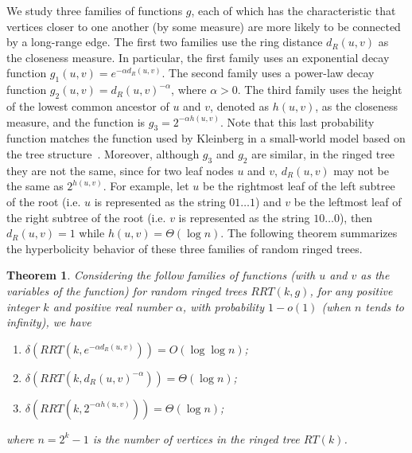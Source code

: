 \documentclass[11pt]{article}
\newtheorem{thm}{Theorem}
\begin{document}
We study three families of functions $g$, each of which has the characteristic
	that vertices closer to one another (by some measure) are more likely
	to be connected by a long-range edge.
The first two families use the ring distance $d_R(u,v)$ as the closeness
	measure.
In particular, the first family uses an exponential decay function
	$g_1(u,v) = e^{-\alpha d_R(u,v)}$.
The second family uses a power-law decay function
	$g_2(u,v) = d_R(u,v)^{-\alpha}$, where $\alpha > 0$.
The third family uses the height of the lowest common ancestor
	of $u$ and $v$, denoted as $h(u,v)$, as the closeness measure,
	and the function is $g_3=2^{-\alpha h(u,v)}$.
Note that this last probability function matches the function used by 
Kleinberg in a small-world model based on the tree structure~\cite{Kle01}.
Moreover, although $g_3$ and $g_2$ are similar, 
	in the ringed tree they are not the same, 
	since for two leaf nodes $u$ and $v$, $d_R(u,v)$ may not be the same as $2^{h(u,v)}$.
For example, let $u$ be the rightmost leaf of the left subtree of the root 
	(i.e. $u$ is represented as the string $01\ldots 1$) and $v$ be the leftmost leaf
	of the right subtree of the root (i.e. $v$ is represented as the string $10\ldots 0$),
	then $d_R(u,v)=1$ while $h(u,v)= \Theta(\log n)$.
The following theorem summarizes the hyperbolicity behavior of these three 
families of random ringed trees.

\begin{thm} \label{thm:randomRT}
Considering the follow families of functions (with $u$ and $v$
	as the variables of the function) for random ringed trees
	$RRT(k,g)$, for any positive integer $k$ and
	positive real number $\alpha$, 
	with probability $1-o(1)$ (when $n$ tends to infinity), 
	we have
\begin{enumerate}
\item
$\delta(RRT(k,e^{-\alpha d_R(u,v)}))=O(\log \log n)$;
\item
$\delta(RRT(k,d_R(u,v)^{-\alpha}))=\Theta(\log n)$;
\item
$\delta(RRT(k,2^{-\alpha h(u,v)}))=\Theta(\log n)$;
\end{enumerate}
where $n=2^{k}-1$ is the number of
	vertices in the ringed tree $RT(k)$.
\end{thm}
\end{document}
